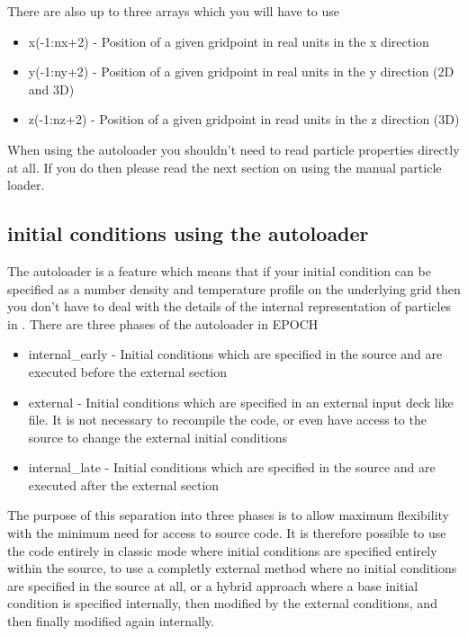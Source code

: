 \documentclass[12pt,a4paper]{article}
\newcommand{\EPOCH}{{\color{warwickdark}\fontfamily{phv}\selectfont{EPOCH}}}
\begin{document}
There are also up to three arrays which you will have to use
\begin{itemize}
\item x(-1:nx+2) - Position of a given gridpoint in real units in the x
  direction
\item y(-1:ny+2) - Position of a given gridpoint in real units in the y
  direction (2D and 3D)
\item z(-1:nz+2) - Position of a given gridpoint in read units in the z
  direction (3D)
\end{itemize}

When using the autoloader you shouldn't need to read particle properties
directly at all. If you do then please read the next section on using the
manual particle loader.

\subsection{{\EPOCH} initial conditions using the autoloader}
The {\EPOCH} autoloader is a feature which means that if your initial condition
can be specified as a number density and temperature profile on the underlying
grid then you don't have to deal with the details of the internal
representation of particles in \EPOCH. There are three phases of the
autoloader in EPOCH

\begin{itemize}
\item internal\_early - Initial conditions which are specified in the {\EPOCH}
  source and are executed before the external section
\item external - Initial conditions which are specified in an external input
  deck like file. It is not necessary to recompile the code, or even have
  access to the source to change the external initial conditions
\item internal\_late - Initial conditions which are specified in the {\EPOCH}
  source and are executed after the external section
\end{itemize}

The purpose of this separation into three phases is to allow maximum
flexibility with the minimum need for access to source code. It is therefore
possible to use the code entirely in classic mode where initial conditions are
specified entirely within the {\EPOCH} source, to use a completly external
method where no initial conditions are specified in the {\EPOCH} source at all,
or a hybrid approach where a base initial condition is specified internally,
then modified by the external conditions, and then finally modified again
internally.
\end{document}
